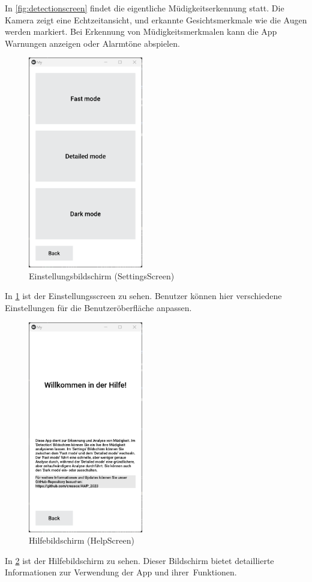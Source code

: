 In \ref{fig:detectionscreen} findet die eigentliche Müdigkeitserkennung statt. Die Kamera zeigt eine Echtzeitansicht, und erkannte Gesichtsmerkmale wie die Augen werden markiert. Bei Erkennung von Müdigkeitsmerkmalen kann die App Warnungen anzeigen oder Alarmtöne abspielen.
\begin{figure}[h]
	\centering
	\includegraphics[width=5cm]{images/settingscreen.png} %
	\caption{Einstellungsbildschirm (SettingsScreen)}
	\label{fig:settingscreen}
\end{figure}
In \ref{fig:settingscreen} ist der Einstellungsscreen zu sehen. Benutzer können hier verschiedene Einstellungen für die Benutzeröberfläche anpassen.
\begin{figure}[h]
	\centering
	\includegraphics[width=5cm]{images/helpscreen.png} %
	\caption{Hilfebildschirm (HelpScreen)}
	\label{fig:helpscreen}
\end{figure}
In \ref{fig:helpscreen} ist der Hilfebildschirm zu sehen. Dieser Bildschirm bietet detaillierte Informationen zur Verwendung der App und ihrer Funktionen.